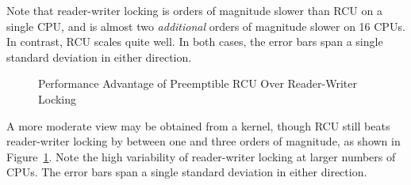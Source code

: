 Note that reader-writer locking is orders of magnitude slower than RCU
on a single CPU, and is almost two \emph{additional} orders of magnitude
slower on 16 CPUs.
In contrast, RCU scales quite well.
In both cases, the error bars span a single standard deviation in either
direction.

\begin{figure}[tb]
\centering
{}
\caption{Performance Advantage of Preemptible RCU Over Reader-Writer Locking}
\label{fig:defer:Performance Advantage of Preemptible RCU Over Reader-Writer Locking}
\end{figure}

A more moderate view may be obtained from a 
kernel, though RCU still beats reader-writer locking by between one and
three orders of magnitude, as shown in
Figure~\ref{fig:defer:Performance Advantage of Preemptible RCU Over Reader-Writer Locking}.
Note the high variability of reader-writer locking at larger numbers of CPUs.
The error bars span a single standard deviation in either direction.

